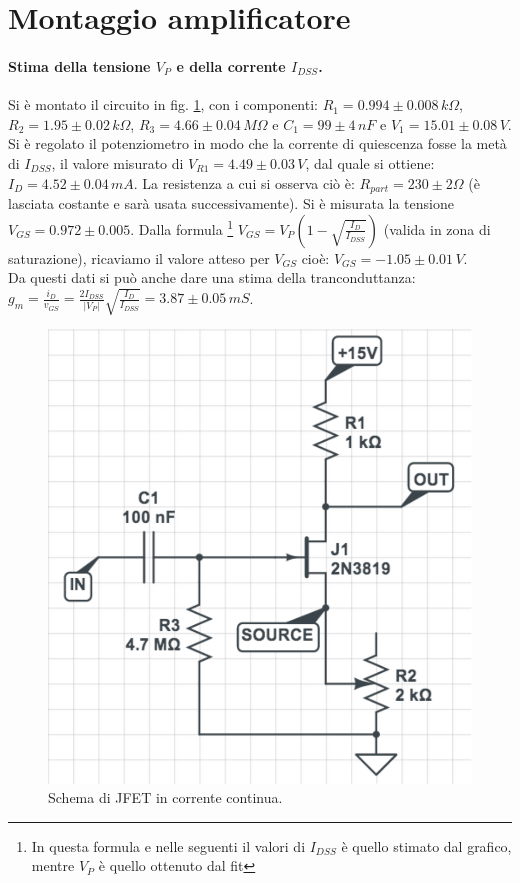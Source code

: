 \documentclass[10pt,a4paper]{article}
\begin{document}
\section{Montaggio amplificatore}

\paragraph{Stima della tensione $V_P$ e della corrente $I_{DSS}$.}
Si è montato il circuito in fig. \ref{circuito2}, con i componenti: $R_1 = 0.994\pm0.008 \, k\Omega $, $R_2 = 1.95\pm0.02 \, k \Omega $, $R_3 = 4.66 \pm 0.04 \, M \Omega$ e $C_1 = 99\pm4 \, nF$ e $V_1 = 15.01\pm0.08 \, V$. Si è regolato il potenziometro in modo che la corrente di quiescenza fosse la metà di $I_{DSS}$, il valore misurato di $V_{R1} = 4.49 \pm 0.03 \, V$, dal quale si ottiene: $I_D = 4.52\pm0.04\,mA$. La resistenza a cui si osserva ciò è: $R_{part} = 230\pm2 \Omega$ (è lasciata costante e sarà usata successivamente). Si è misurata la tensione $V_{GS} = 0.972 \pm 0.005$. Dalla formula \footnote{In questa formula e nelle seguenti il valori di $I_{DSS}$ è quello stimato dal grafico, mentre $V_P$ è quello ottenuto dal fit} $V_{GS} = V_{P} \left( 1 - \sqrt{\frac{I_D}{I_{DSS}}} \right)$ (valida in zona di saturazione), ricaviamo il valore atteso per $V_{GS}$ cioè: $V_{GS} = -1.05\pm0.01 \, V$.\\ 
Da questi dati si può anche dare una stima della tranconduttanza: $g_m = \frac{i_D}{v_{GS}} = \frac{2I_{DSS}}{\vert V_P \vert} \sqrt{\frac{I_D}{I_{DSS}}} = 3.87\pm0.05\,mS$. 

\begin{figure}
\centering
\includegraphics[scale=0.4]{circuito2.png}
\caption{Schema di JFET in corrente continua.\label{circuito2}}
\end{figure}
\end{document}

